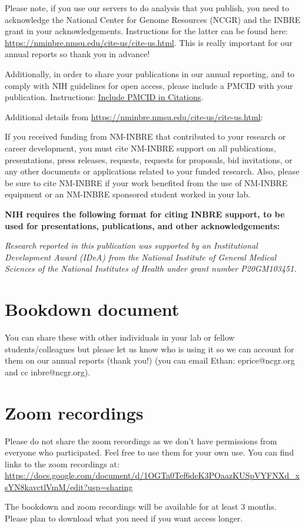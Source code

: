 \documentclass[
]{book}
\begin{document}
Please note, if you use our servers to do analysis that you publish, you need to acknowledge the National Center for Genome Resources (NCGR) and the INBRE grant in your acknowledgements. Instructions for the latter can be found here: \url{https://nminbre.nmsu.edu/cite-us/cite-us.html}. This is really important for our annual reports so thank you in advance!

Additionally, in order to share your publications in our annual reporting, and to comply with NIH guidelines for open access, please include a PMCID with your publication. Instructions: \href{https://publicaccess.nih.gov/include-pmcid-citations.htm}{Include PMCID in Citations}.

Additional details from \url{https://nminbre.nmsu.edu/cite-us/cite-us.html}:

{If you received funding from NM-INBRE that contributed to your research or career development, you must cite NM-INBRE support on all publications, presentations, press releases, requests, requests for proposals, bid invitations, or any other documents or applications related to your funded research. Also, please be sure to cite NM-INBRE if your work benefited from the use of NM-INBRE equipment or an NM-INBRE sponsored student worked in your lab.}

{\textbf{NIH requires the following format for citing INBRE support, to be used for presentations, publications, and other acknowledgements:}}

{\emph{Research reported in this publication was supported by an Institutional Development Award (IDeA) from the National Institute of General Medical Sciences of the National Institutes of Health under grant number P20GM103451.}}

\hypertarget{bookdown-document}{%
\section*{Bookdown document}\label{bookdown-document}}

You can share these with other individuals in your lab or fellow students/colleagues but please let us know who is using it so we can account for them on our annual reports (thank you!) (you can email Ethan: eprice@ncgr.org and cc inbre@ncgr.org).

\hypertarget{zoom-recordings}{%
\section*{Zoom recordings}\label{zoom-recordings}}

Please do not share the zoom recordings as we don't have permissions from everyone who participated. Feel free to use them for your own use.
You can find links to the zoom recordings at: \url{https://docs.google.com/document/d/1OGTa0Tef6deK3POaazKUSpVYFNXd_xsYN8kavctlVmM/edit?usp=sharing}

The bookdown and zoom recordings will be available for at least 3 months. Please plan to download what you need if you want access longer.

  
\end{document}
